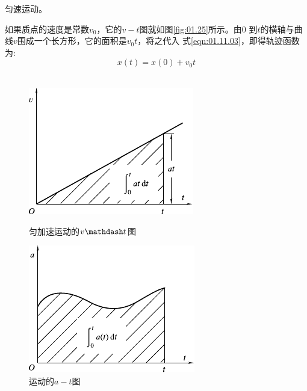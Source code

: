 \setcounter{example}{0}
\example 匀速运动。

如果质点的速度是常数$v_0$，它的$v-t$图就如图\ref{fig:01.25}所示。由0
到$t$的横轴与曲线$v$围成一个长方形，它的面积是$v_0t$，将之代入
式\eqref{eqn:01.11.03}，即得轨迹函数为:
\begin{equation}\label{eqn:01.11.04}
  x\left(t\right)=x\left(0\right)+v_0 t
\end{equation}
~\vspace{-1.5em}
\begin{figure}[!h]
  \begin{minipage}[b]{14em}
    \centering
    \includegraphics[width=0.8\linewidth]{figure/fig01.26}
    \caption{匀加速运动的$v \mathdash t$图}
    \label{fig:01.26}
  \end{minipage}\hfill
  \begin{minipage}[b]{14em}
    \centering
    \includegraphics[width=0.8\linewidth]{figure/fig01.27}
    \caption{运动的$a-t$图}
    \label{fig:01.27}
  \end{minipage}
\end{figure}

